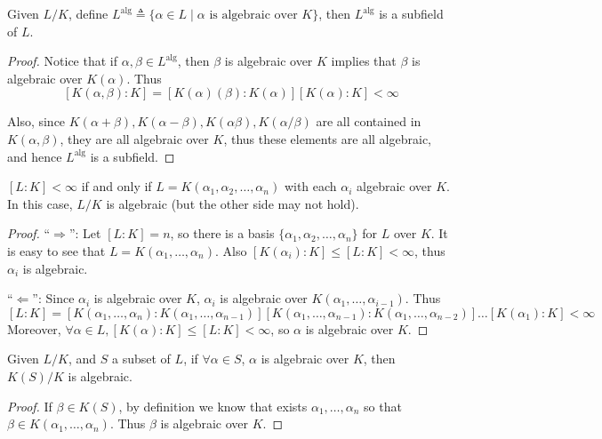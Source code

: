 \begin{prop} \label{prop:alg-elements-form-a-field}
  Given $L/K$, define $L^{\text{alg}} \triangleq \{ \alpha \in L \mid \alpha \text{ is algebraic over } K \}$,
  then $L^{\text{alg}}$ is a subfield of $L$.

  \begin{proof}
    Notice that if $\alpha, \beta \in L^{\text{alg}}$, then $\beta$ is algebraic over $K$
    implies that $\beta$ is algebraic over $K(\alpha)$. Thus
    \[ [K(\alpha, \beta): K] = [K(\alpha)(\beta): K(\alpha)] [K(\alpha): K]
      < \infty \]

    Also, since $K(\alpha + \beta), K(\alpha - \beta), K(\alpha \beta), K(\alpha / \beta)$ are
    all contained in $K(\alpha, \beta)$, they are all algebraic over $K$, thus
    these elements are all algebraic, and hence $L^{\text{alg}}$ is a subfield.
  \end{proof}
\end{prop}

\begin{prop}
  $[L: K] < \infty$ if and only if $L = K(\alpha_1, \alpha_2, \dots, \alpha_n)$ with each $\alpha_i$
  algebraic over $K$. In this case, $L / K$ is algebraic (but the other side may not hold).

  \begin{proof}
    ``$\Rightarrow$'': Let $[L: K] = n$, so there is a basis $\{ \alpha_1, \alpha_2, \dots, \alpha_n \}$
    for $L$ over $K$. It is easy to see that $L = K(\alpha_1, \dots, \alpha_n)$.
    Also $[K(\alpha_i): K] \leq [L: K] < \infty$, thus $\alpha_i$ is algebraic.

    ``$\Leftarrow$'': Since $\alpha_i$ is algebraic over $K$, $\alpha_i$ is algebraic over $K(\alpha_1, \dots, \alpha_{i-1})$.
    Thus
    \[ [L: K] = [K(\alpha_1, \dots, \alpha_n): K(\alpha_1, \dots, \alpha_{n-1})]
      [K(\alpha_1, \dots, \alpha_{n-1}): K(\alpha_1, \dots, \alpha_{n-2})] \dots [K(\alpha_1): K] < \infty \]
    Moreover, $\forall \alpha \in L, [K(\alpha): K] \leq [L: K] < \infty$, so $\alpha$ is algebraic over $K$.
  \end{proof}
\end{prop}

\begin{coro}
  Given $L/K$, and $S$ a subset of $L$, if $\forall \alpha \in S$, $\alpha$ is
  algebraic over $K$, then $K(S) / K$ is algebraic.

  \begin{proof}
    If $\beta \in K(S)$, by definition we know that exists $\alpha_1, \dots, \alpha_n$
    so that $\beta \in K(\alpha_1, \dots, \alpha_n)$. Thus $\beta$ is algebraic over $K$.
  \end{proof}
\end{coro}

